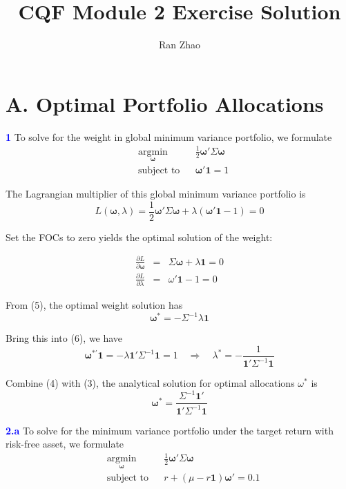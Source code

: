 \documentclass[a4paper,11pt] {article}
\author{Ran Zhao}
\title{CQF Module 2 Exercise Solution}
\date{}
\begin{document}
\maketitle


\section*{A. Optimal Portfolio Allocations}
\textcolor{blue}{\bf 1 } To solve for the weight in global minimum variance portfolio, we formulate
\begin{equation*}
\begin{aligned}
& \underset{\mathbf{\omega}}{\text{argmin}} & & \frac{1}{2}\mathbf{\omega}'\Sigma\mathbf{\omega} \\
& \text{subject to}
& & \mathbf{\omega}'\mathbf{1} = 1
\end{aligned}
\end{equation*}

The Lagrangian multiplier of this global minimum variance portfolio is
$$
L(\mathbf{\omega}, \lambda) = \frac{1}{2}\mathbf{\omega}'\Sigma\mathbf{\omega} + \lambda(\mathbf{\omega}'\mathbf{1} - 1) = 0
$$

Set the FOCs to zero yields the optimal solution of the weight:

\begin{eqnarray}
\frac{\partial L}{\partial \mathbf{\omega}} &=& \Sigma \mathbf{\omega} + \lambda \mathbf{1} = 0 \\
\frac{\partial L}{\partial \lambda} &=& \omega'\mathbf{1} - 1 = 0
\end{eqnarray}

From (5), the optimal weight solution has
\begin{equation}
\mathbf{\omega}^* = -\Sigma^{-1} \lambda \mathbf{1}
\end{equation}

Bring this into (6), we have
\begin{equation}
\mathbf{\omega}^{*'} \mathbf{1} = -\lambda \mathbf{1}' \Sigma^{-1} \mathbf{1} = 1 \quad \Rightarrow \quad \lambda^* = -\frac{1}{\mathbf{1}'\Sigma^{-1}\mathbf{1}}
\end{equation}

Combine (4) with (3), the analytical solution for optimal allocations $\omega^*$ is
$$
\mathbf{\omega}^* = \frac{\Sigma^{-1}\mathbf{1}'}{\mathbf{1}'\Sigma^{-1}\mathbf{1}}
$$

\textcolor{blue}{\bf 2.a } To solve for the minimum variance portfolio under the target return with risk-free asset, we formulate
\begin{equation*}
\begin{aligned}
& \underset{\mathbf{\omega}}{\text{argmin}} & & \frac{1}{2}\mathbf{\omega}'\Sigma\mathbf{\omega} \\
& \text{subject to}
& & r + (\mu-r\mathbf{1})\mathbf{\omega}' = 0.1
\end{aligned}
\end{equation*}
\end{document}
